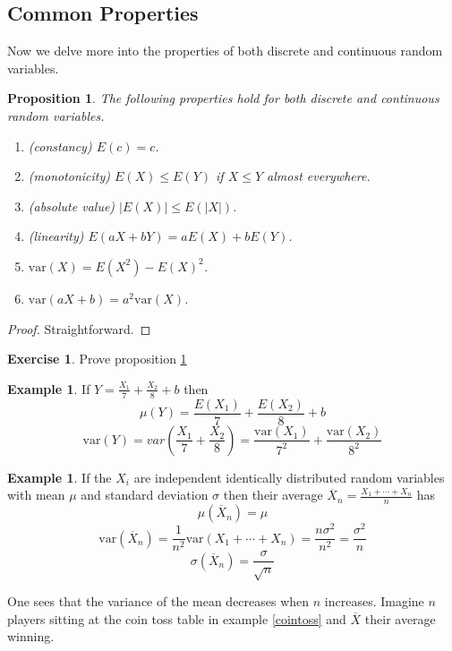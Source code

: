 \documentclass[12pt]{amsart}
\newtheorem{proposition}[theorem]{Proposition}
\theoremstyle{definition}
\newtheorem{example}[theorem]{Example}
\newtheorem{exercise}[theorem]{Exercise}
\begin{document}
\subsection{Common Properties} Now we delve more into the properties of both discrete and continuous random variables.

\begin{proposition} \label{mean_var_covar_1} The following properties hold for both discrete and continuous random variables.
\begin{enumerate}[1.]
\item (constancy) $E(c) = c$.
\item (monotonicity) $E(X) \leq E(Y)$ if $X \leq Y$ almost everywhere.
\item (absolute value) $|E(X)| \leq E(|X|)$.
\item (linearity) $E(aX + bY) = aE(X) + bE(Y)$.
\item $\text{var}(X) = E(X^2) - E(X)^2$.
\item \label{mean_var_covar_1.7} $\text{var}(aX + b) = a^2 \text{var}(X)$.
\end{enumerate}
\end{proposition}
\begin{proof} Straightforward.
\end{proof}

\begin{exercise} Prove proposition \ref{mean_var_covar_1}
\end{exercise}

\begin{example} If $Y = \frac{X_1}{7} + \frac{X_2}{8} + b$ then
$$\mu(Y) = \frac{E(X_1)}{7} + \frac{E(X_2)}{8} + b$$
$$\text{var}(Y) = var \left( \frac{X_1}{7}+\frac{X_2}{8} \right) = \frac{\text{var}(X_1)}{7^2} + \frac{\text{var}(X_2)}{8^2}$$
\end{example}

\begin{example} If the $X_i$ are independent identically distributed random variables with mean $\mu$ and standard deviation $\sigma$ then their average $\overline{X}_n = \frac{X_1 + \cdots + X_n}{n}$ has
$$\mu(\overline{X}_n) = \mu$$
$$\text{var}(\overline{X}_n) = \frac{1}{n^2}\text{var}(X_1 + \cdots + X_n) = \frac{n \sigma^2}{n^2} = \frac{\sigma
^2}{n}$$
$$\sigma(\overline{X}_n) = \frac{\sigma}{\sqrt n}$$

One sees that the variance of the mean decreases when $n$ increases. Imagine $n$ players sitting at the coin toss table in example \ref{cointoss} and $\overline{X}$ their average winning.
\end{example}
\end{document}
